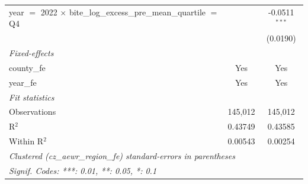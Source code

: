 \begin{tabular}{lcc}
   year $=$ 2022 $\times$ bite\_log\_excess\_pre\_mean\_quartile $=$ Q4       &                          & -0.0511$^{***}$\\   
                                                                              &                          & (0.0190)\\   
   \midrule
   \emph{Fixed-effects}\\
   county\_fe                                                                 & Yes                      & Yes\\  
   year\_fe                                                                   & Yes                      & Yes\\  
   \midrule
   \emph{Fit statistics}\\
   Observations                                                               & 145,012                  & 145,012\\  
   R$^2$                                                                      & 0.43749                  & 0.43585\\  
   Within R$^2$                                                               & 0.00543                  & 0.00254\\  
   \midrule \midrule
   \multicolumn{3}{l}{\emph{Clustered (cz\_aewr\_region\_fe) standard-errors in parentheses}}\\
   \multicolumn{3}{l}{\emph{Signif. Codes: ***: 0.01, **: 0.05, *: 0.1}}\\
\end{tabular}
\par\endgroup


